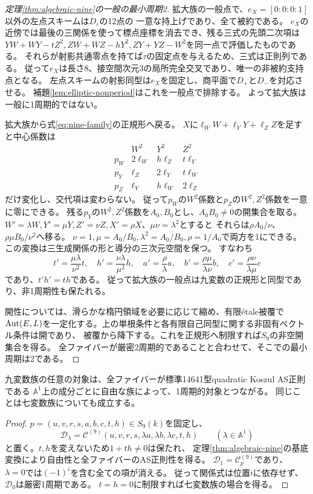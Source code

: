 \begin{proof}[定理\ref{thm:algebraic-nine}の一般の最小周期2]
拡大族の一般点で、$e_X=[0:0:0:1]$以外の左点スキームは$D_\varepsilon$の12点の
一意な持上げであり、全て被約である。
$e_X$の近傍では最後の三関係を使って標点座標を消去でき、残る三式の先頭二次項は
$YW+WY-tZ^2,ZW+WZ-hY^2,ZY+YZ-W^2$を同一点で評価したものである。
それらが射影共通零点を持てば$\tau$の固定点を与えるため、三式は正則列である。
従って$e_X$は長さ8、接空間次元3の局所完全交叉であり、唯一の非被約支持点となる。
左点スキームの射影同型は$e_X$を固定し、商平面で$D_+$と$D_-$を対応させる。
補題\ref{lem:elliptic-nonperiod}はこれを一般点で排除する。
よって拡大族は一般に1周期的ではない。

拡大族から式\eqref{eq:nine-family}の正規形へ戻る。
$X$に$\ell_WW+\ell_YY+\ell_ZZ$を足すと中心係数は
\[
\begin{array}{c|ccc}
 &W^2&Y^2&Z^2\\\hline
 p_W&2\ell_W&h\ell_Z&t\ell_Y\\
 p_Y&\ell_Z&2\ell_Y&t\ell_W\\
 p_Z&\ell_Y&h\ell_W&2\ell_Z
\end{array}
\]
だけ変化し、交代項は変わらない。
従って$p_W$の$W^2$係数と$p_Z$の$W^2,Z^2$係数を一意に零にできる。
残る$p_Y$の$W^2,Z^2$係数を$A_0,B_0$とし、$A_0B_0\ne0$の開集合を取る。
$W'=\lambda W,Y'=\mu Y,Z'=\nu Z,X'=\rho X$、$\mu\nu=\lambda^2$とすると
それらは$\rho A_0/\nu$、$\rho\mu B_0/\nu^2$へ移る。
$\nu=1,\mu=A_0/B_0,\lambda^2=A_0/B_0,\rho=1/A_0$で両方を1にできる。
この変換は三生成関係の形と導分の三次元空間を保つ。
すなわち
\[
 t'=\frac{\mu\lambda}{\nu^2}t,\quad h'=\frac{\nu\lambda}{\mu^2}h,
 \quad a'=\frac\rho\lambda a,\quad b'=\frac{\rho\mu}{\lambda\nu}b,
 \quad c'=\frac{\rho\nu}{\lambda\mu}c
\]
であり、$t'h'=th$である。
従って拡大族の一般点は九変数の正規形と同型であり、非1周期性も保たれる。

開性については、滑らかな楕円領域を必要に応じて縮め、有限\'etale被覆で
$\operatorname{Aut}(E,L)$を一定化する。上の単根条件と各有限自己同型に関する非固有ベクトル条件は開であり、
被覆から降下する。これを正規形へ制限すれば$S_9$の非空開集合を得る。
全ファイバーが厳密2周期的であることと合わせて、そこでの最小周期は2である。
\end{proof}

\begin{corollary}[1周期的対象への代数的特殊化]\label{cor:nine-to-period-one}
九変数族の任意の対象は、全ファイバーが標準14641型quadratic Koszul AS正則である
$\mathbb A^1$上の成分ごとに自由な族によって、1周期的対象とつながる。
同じことは七変数族についても成立する。
\end{corollary}
\begin{proof}
$p=(u,v,r,s,a,b,c,t,h)\in S_9(k)$を固定し、
\[
 \mathcal D_\lambda
 =\mathcal C^{(9)}(u,v,r,s,\lambda a,\lambda b,\lambda c,t,h)
 \qquad(\lambda\in\mathbb A^1)
\]
と置く。$t,h$を変えないため$1+th\ne0$は保たれ、
定理\ref{thm:algebraic-nine}の基底変換により自由性と全ファイバーのAS正則性を得る。
$\mathcal D_1=\mathcal C^{(9)}_p$であり、
$\lambda=0$では$(-1)^i$を含む全ての項が消える。
従って関係式は位置$i$に依存せず、$\mathcal D_0$は厳密1周期である。
$t=h=0$に制限すれば七変数族の場合を得る。
\end{proof}

